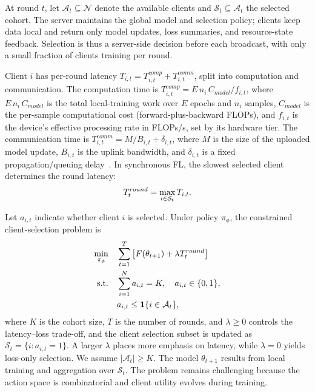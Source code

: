 \documentclass[journal]{IEEEtran}
\newcommand{\revision}[1]{#1}
\begin{document}
\revision{At round $t$, let $\mathcal{A}_t \subseteq \mathcal{N}$ denote the available clients and $\mathcal{S}_t \subseteq \mathcal{A}_t$ the selected cohort. The server maintains the global model and selection policy; clients keep data local and return only model updates, loss summaries, and resource-state feedback. Selection is thus a server-side decision before each broadcast, with only a small fraction of clients training per round.}

\revision{Client $i$ has per-round latency $T_{i,t}=T_{i,t}^{comp}+T_{i,t}^{comm}$, split into computation and communication. The computation time is $T_{i,t}^{comp} = E\, n_i\, C_{model}/f_{i,t}$, where $E\, n_i\, C_{model}$ is the total local-training work over $E$ epochs and $n_i$ samples, $C_{model}$ is the per-sample computational cost (forward-plus-backward FLOPs), and $f_{i,t}$ is the device's effective processing rate in FLOPs/s, set by its hardware tier. The communication time is $T_{i,t}^{comm} = M/B_{i,t} + \delta_{i,t}$, where $M$ is the size of the uploaded model update, $B_{i,t}$ is the uplink bandwidth, and $\delta_{i,t}$ is a fixed propagation/queuing delay~\cite{nishio2019client}. %
In synchronous FL, the slowest selected client determines the round latency:}
\begin{equation}
	\color{black}
	T_t^{round} = \max_{i \in \mathcal{S}_t} T_{i,t}.
	\label{eq:round_latency}
\end{equation}


\revision{Let $a_{i,t}$ indicate whether client $i$ is selected. Under policy $\pi_\phi$, the constrained client-selection problem is}
\begin{equation}
	\color{black}
	\begin{aligned}
		\min_{\pi_\phi}\quad & \sum_{t=1}^{T} \left[F(\theta_{t+1}) + \lambda T_t^{round}\right] \\
		\text{s.t.}\quad & \sum_{i=1}^{N} a_{i,t}=K,\quad a_{i,t}\in\{0,1\}, \\
		& a_{i,t}\leq \mathbf{1}\{i\in\mathcal{A}_t\},		
	\end{aligned}
	\label{eq:bi_objective}
\end{equation}
\revision{where $K$ is the cohort size, $T$ is the number of rounds, and $\lambda \geq 0$ controls the latency--loss trade-off, and the client selection subset is updated as $\mathcal{S}_t=\{i:a_{i,t}=1\}$. A larger $\lambda$ places more emphasis on latency, while $\lambda=0$ yields loss-only selection. We assume $|\mathcal{A}_t|\geq K$. The model $\theta_{t+1}$ results from local training and aggregation over $\mathcal{S}_t$. The problem remains challenging because the action space is combinatorial and client utility evolves during training.}
\end{document}
